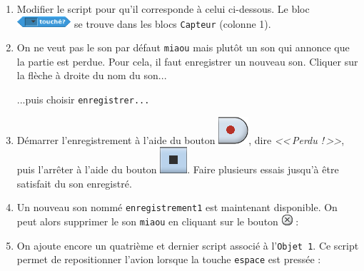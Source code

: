 \begin{enumerate}
\item Modifier le script pour qu'il corresponde à celui ci-dessous. Le bloc \includegraphics[width=2cm]{./images/scratch/BlocCapteur} se trouve dans les blocs \texttt{Capteur} (colonne 1).
\item On ne veut pas le son par défaut \texttt{miaou} mais plutôt un son qui annonce que la partie est perdue. Pour cela, il faut enregistrer un nouveau son. Cliquer sur la flèche à droite du nom du son...

...puis choisir \texttt{enregistrer...}

\item Démarrer l'enregistrement à l'aide du bouton \includegraphics[width=.7cm]{./images/scratch/SonEnregistre}, dire \emph{<<\,Perdu !\,>>}, puis l'arrêter à l'aide du bouton \includegraphics[width=.7cm]{./images/scratch/SonStop}. Faire plusieurs essais jusqu'à être satisfait du son enregistré.
\item Un nouveau son nommé \texttt{enregistrement1} est maintenant disponible. On peut alors supprimer le son \texttt{miaou} en cliquant sur le bouton \includegraphics[width=.7cm]{./images/scratch/Supprimer} :
\item On ajoute encore un quatrième et dernier script associé à l'\texttt{Objet 1}. Ce script permet de repositionner l'avion lorsque la touche \texttt{espace} est pressée :
\end{enumerate}













